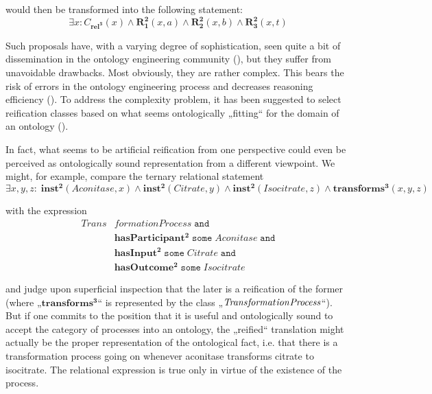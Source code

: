 \documentclass{ao2e}
\newcommand{\mirel}[1]{\ensuremath{\mathrm{\mathbf{#1}}}}
\newcommand{\mclass}[1]{\ensuremath{\mathit{#1}}}
\newcommand{\mrel}[2]{\mirel{#1^#2}}
\newcommand{\mrelb}[1]{\mrel{#1}{2}}
\newcommand{\mrelt}[1]{\mrel{#1}{3}}
\begin{document}
would then be transformed into the following statement:
\begin{equation}
\exists x: \mclass{C_\mrelt{rel}}(x) \wedge
\mrelb{R_1}(x,a) \wedge
\mrelb{R_2}(x,b) \wedge
\mrelb{R_3}(x,t) 
\end{equation}

Such proposals have, with a varying degree of sophistication, seen quite a bit
of dissemination in the ontology engineering community (\cite{ODP:nary}), but they suffer
from unavoidable drawbacks. Most obviously, they are rather complex. This bears
the risk of errors in the ontology engineering process and decreases reasoning
efficiency (\cite{Grewe:2010}). To address the complexity problem, it has been suggested to
select reification classes based on what seems ontologically „fitting“ for the
domain of an ontology (\cite{Fiadeiro:2010}).

In fact, what seems to be artificial reification from one perspective could even
be perceived as ontologically sound representation from a different viewpoint.
We might, for example, compare the ternary relational statement
\begin{equation}
\exists x,y,z:\;\mrelb{inst}(\mclass{Aconitase},x) \wedge
\mrelb{inst}(\mclass{Citrate},y) \wedge \mrelb{inst}(\mclass{Isocitrate},z)
\wedge  \mrelt{transforms}(x,y,z)
\end{equation}

with the expression
\begin{equation}
\begin{split}\mclass{Trans}&\mclass{formationProcess}\;\mathtt{and}\\ 
            &\mrelb{hasParticipant}\;\mathtt{some}\;\mclass{Aconitase}
\;\mathtt{and} \\
            &\mrelb{hasInput}\;\mathtt{some}\;\mclass{Citrate}\;\mathtt{and}\\\ 
            &\mrelb{hasOutcome}\;\mathtt{some}\;\mclass{Isocitrate}
\end{split}
\end{equation}

and judge upon superficial inspection that the later is a reification of the
former (where „\mrelt{transforms}“ is represented by the class „\mclass{Trans\-format\-ion\-Process}“). But if one commits to the position that it is useful and
ontologically sound to accept the category of processes into an ontology, the
„reified“ translation might actually be the proper representation of the
ontological fact, i.e. that there is a transformation process going on whenever
aconitase transforms citrate to isocitrate. The relational expression is true
only in virtue of the existence of the process.
\end{document}
